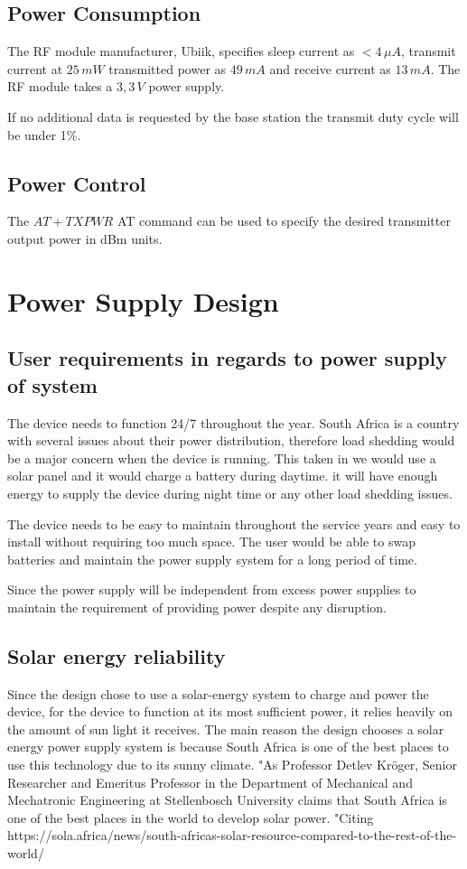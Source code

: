 \documentclass[12pt]{article}
\begin{document}
\subsection{Power Consumption}
The RF module manufacturer, Ubiik, specifies sleep current as $<4\,\mu A$, transmit current at $25\,mW$ 
transmitted power as $49\,mA$ and receive current as $13\,mA$. %
The RF module takes a $3,3\,V$ power supply.

If no additional data is requested by the base station the transmit duty cycle will be under 1\%.

\subsection{Power Control}
The $AT+TXPWR$ AT command can be used to specify the desired transmitter output power in dBm units.

\section{Power Supply Design}
\subsection{User requirements in regards to power supply of system}
The device needs to function 24/7 throughout the year. South Africa is a country with several issues about their power distribution, therefore load shedding would be a major concern when the device is running. This taken in we would use a solar panel and it would charge a battery during daytime. it will have enough energy to supply the device during night time or any other load shedding issues.

The device needs to be easy to maintain throughout the service years and easy to install without requiring too much space. The user would be able to swap batteries and maintain the power supply system for a long period of time.

Since the power supply will be independent from  excess power supplies to maintain the requirement of providing power despite any disruption.

\subsection{Solar energy reliability}
Since the design chose to use a solar-energy system to charge and power the device, for the device to function at its most sufficient power, it relies heavily on the amount of sun light it receives. The main reason the design chooses a solar energy power supply system is because South Africa is one of the best places to use this technology due to its sunny climate. "As Professor Detlev Kröger, Senior Researcher and Emeritus Professor in the Department of Mechanical and Mechatronic Engineering at Stellenbosch University claims that South Africa is one of the best places in the world to develop solar power. "Citing
https://sola.africa/news/south-africas-solar-resource-compared-to-the-rest-of-the-world/
\end{document}
